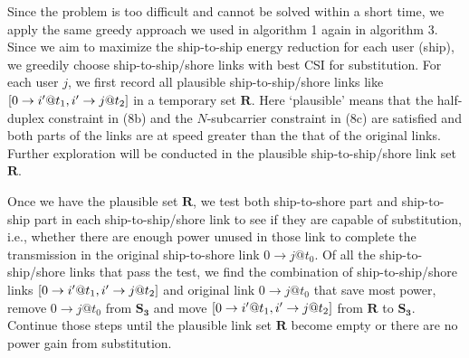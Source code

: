 \documentclass[conference]{IEEEtran}
\begin{document}
Since the problem is too difficult and cannot be solved within a short time, we apply the same greedy approach we used in algorithm 1 again in algorithm 3. Since we aim to maximize the ship-to-ship energy reduction for each user (ship), we greedily choose ship-to-ship/shore links with best CSI for substitution. For each user $j$, we first record all plausible ship-to-ship/shore links like $\left[ {{\rm{0}} \to i'@{t_1},i' \to j@{t_2}} \right]$ in a temporary set $\mathbf{R}$. Here `plausible' means that the half-duplex constraint in (8b) and the $N$-subcarrier constraint in (8c) are satisfied and both parts of the links are at speed greater than the that of the original links. Further exploration will be conducted in the plausible ship-to-ship/shore link set $\mathbf{R}$. 

Once we have the plausible set $\mathbf{R}$, we test both ship-to-shore part and ship-to-ship part in each ship-to-ship/shore link to see if they are capable of substitution, i.e., whether there are enough power unused in those link to complete the transmission in the original ship-to-shore link $0 \to j @{t_0}$. Of all the ship-to-ship/shore links that pass the test, we find the combination of ship-to-ship/shore links $\left[ {{\rm{0}} \to i'@{t_1},i' \to j@{t_2}} \right]$ and original link $0 \to j @{t_0}$ that save most power, remove $0 \to j @{t_0}$ from ${{\mathbf{S}}_{\mathbf{3}}}$ and move $\left[ {{\rm{0}} \to i'@{t_1},i' \to j@{t_2}} \right]$ from $\mathbf{R}$ to ${{\mathbf{S}}_{\mathbf{3}}}$. Continue those steps until the plausible link set $\mathbf{R}$ become empty or there are no power gain from substitution.
\end{document}
